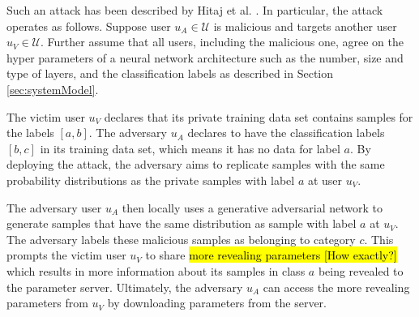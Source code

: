 \documentclass[conference]{IEEEtran}
\begin{document}





Such an attack has been described by Hitaj et al. \cite{hitaj2017deep}. In particular, the attack operates as follows. 
Suppose user $u_A\in\mathcal{U}$ is malicious and targets another user $u_V\in\mathcal{U}$. Further assume that all users, including
the malicious one, agree on the hyper parameters of a neural network architecture such as the number, size and type of layers,  and the
classification labels as described in Section \ref{sec:systemModel}.

The victim user $u_V$ declares that its private training data set contains samples for the  labels $[a,b]$. The adversary
$u_A$ declares to have the classification labels $[b,c]$ in its training data set, which means it has no data for label $a$. By
deploying the attack, the adversary aims to replicate samples with the same probability distributions as the private samples with label
$a$ at user $u_V$.

The adversary user $u_A$ then locally uses a generative adversarial network to generate samples that have the same distribution as
sample with label $a$ at $u_V$. The adversary labels these malicious samples as belonging to category $c$. This prompts the victim 
user $u_V$ to share \hl{more revealing parameters [How exactly?]} which results in more information about
its samples in class $a$ being revealed to the parameter server. Ultimately, the adversary $u_A$ can access the more revealing
parameters from $u_V$ by downloading parameters from the server. 
\end{document}
